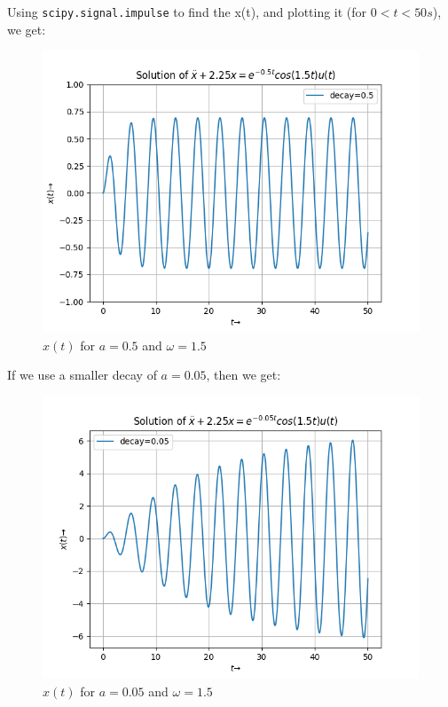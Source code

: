 \documentclass[11pt, a4paper, twoside]{article}
\begin{document}
        Using \texttt{scipy.signal.impulse} to find the x(t), and plotting it (for $0<t<50 s$), we get:
        \begin{figure}[H]
            \centering
            \includegraphics[scale=0.7]{Fig 1.png}
            \caption{$x(t)$ for $a=0.5$ and $\omega=1.5$}
            \label{fig:Fig1}
        \end{figure}

        If we use a smaller decay of $a=0.05$, then we get:
        \begin{figure}[H]
            \centering
            \includegraphics[scale=0.7]{Fig 2.png}
            \caption{$x(t)$ for $a=0.05$ and $\omega=1.5$}
            \label{fig:Fig2}
        \end{figure}
\end{document}
